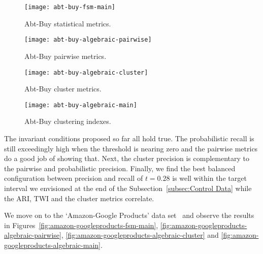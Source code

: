 \begin{figure*}[htbp]
    \begin{minipage}{0.24\textwidth}
        \centering
        \texttt{[image: abt-buy-fsm-main]}
        \caption{Abt-Buy statistical metrics.}
        \label{fig:abt-buy-fsm-main}
    \end{minipage}
    \begin{minipage}{0.24\textwidth}
        \centering
        \texttt{[image: abt-buy-algebraic-pairwise]}
        \caption{Abt-Buy pairwise metrics.}
        \label{fig:abt-buy-algebraic-pairwise}
    \end{minipage}
    \begin{minipage}{0.24\textwidth}
        \centering
        \texttt{[image: abt-buy-algebraic-cluster]}
        \caption{Abt-Buy cluster metrics.}
        \label{fig:abt-buy-algebraic-cluster}
    \end{minipage}
    \begin{minipage}{0.24\textwidth}
        \centering
        \texttt{[image: abt-buy-algebraic-main]}
        \caption{Abt-Buy clustering indexes.}
        \label{fig:abt-buy-algebraic-main}
    \end{minipage}
\end{figure*}\label{abt-buy}

The invariant conditions proposed so far all hold true.
The probabilistic recall is still exceedingly high when the threshold is nearing zero and the
pairwise metrics do a good job of showing that.
Next, the cluster precision is complementary to the pairwise and probabilistic
precision.
Finally, we find the best balanced configuration between precision and recall of
$t=0.28$ is well within the target interval we envisioned at the end of the
Subsection~\ref{subsec:Control Data} while the ARI, TWI and the cluster metrics correlate.

We move on to the `Amazon-Google Products' data set~\cite{vldb2010} and observe
the results in Figures~\ref{fig:amazon-googleproducts-fsm-main},
\ref{fig:amazon-googleproducts-algebraic-pairwise},
\ref{fig:amazon-googleproducts-algebraic-cluster} and
\ref{fig:amazon-googleproducts-algebraic-main}.

